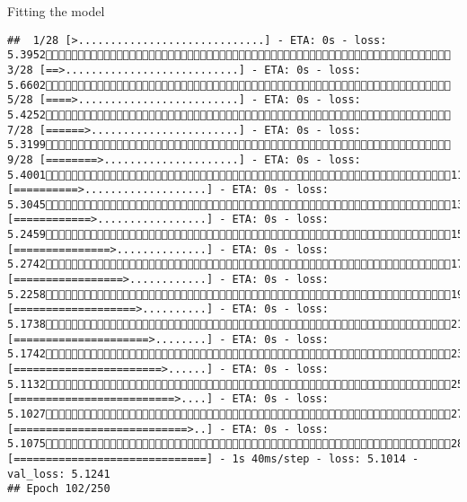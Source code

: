 \documentclass[
  ignorenonframetext,
]{beamer}
\begin{document}
\begin{frame}[fragile]{Fitting the model}
\begin{verbatim}
##  1/28 [>.............................] - ETA: 0s - loss: 5.3952 3/28 [==>...........................] - ETA: 0s - loss: 5.6602 5/28 [====>.........................] - ETA: 0s - loss: 5.4252 7/28 [======>.......................] - ETA: 0s - loss: 5.3199 9/28 [========>.....................] - ETA: 0s - loss: 5.400111/28 [==========>...................] - ETA: 0s - loss: 5.304513/28 [============>.................] - ETA: 0s - loss: 5.245915/28 [===============>..............] - ETA: 0s - loss: 5.274217/28 [=================>............] - ETA: 0s - loss: 5.225819/28 [===================>..........] - ETA: 0s - loss: 5.173821/28 [=====================>........] - ETA: 0s - loss: 5.174223/28 [=======================>......] - ETA: 0s - loss: 5.113225/28 [=========================>....] - ETA: 0s - loss: 5.102727/28 [===========================>..] - ETA: 0s - loss: 5.107528/28 [==============================] - 1s 40ms/step - loss: 5.1014 - val_loss: 5.1241
## Epoch 102/250

\end{verbatim}
\end{frame}
\end{document}
